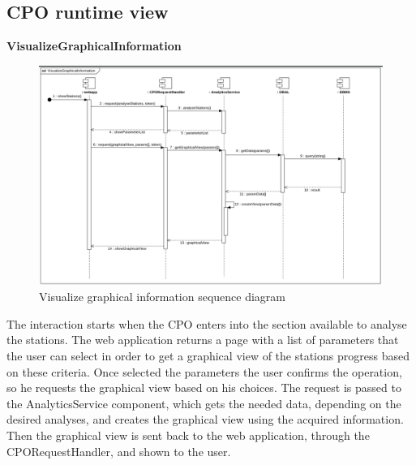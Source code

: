 \clearpage
\subsection{CPO runtime view}
\textbf{VisualizeGraphicalInformation}\\
\begin{figure}[H]
    \centering
    \includegraphics[trim={0 0cm 0 0.15cm},clip,width=1\textwidth]{Images/cp2/runtime/VisualizeGraphicalInformation.png}
    \caption{Visualize graphical information sequence diagram}
\end{figure}
The interaction starts when the CPO enters into the section available to analyse the stations. The web application returns a page with a list of parameters that the user can select in order to get a graphical view of the stations progress based on these criteria. Once selected the parameters the user confirms the operation, so he requests the graphical view based on his choices. The request is passed to the AnalyticsService component, which gets the needed data, depending on the desired analyses, and creates the graphical view using the acquired information. Then the graphical view is sent back to the web application, through the CPORequestHandler, and shown to the user.   

